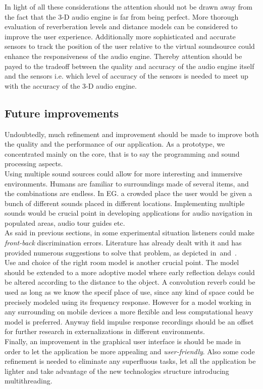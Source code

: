\documentclass[journal]{IEEEtran}
\begin{document}
In light of all these considerations the attention should not be drawn away from the fact that the 3-D audio engine is far from being perfect. More thorough evaluation of reverberation levels and distance models can be considered to improve the user experience. Additionally more sophisticated and accurate sensors to track the position of the user relative to the virtual soundsource could enhance the responsiveness of the audio engine. Thereby attention should be payed to the tradeoff between the quality and accuracy of the audio engine itself and the sensors i.e. which level of accuracy of the sensors is needed to meet up with the accuracy of the 3-D audio engine. 
 

\subsection{Future improvements}
Undoubtedly, much refinement and improvement should be made to improve both the quality and the performance of our application. As a prototype, we concentrated mainly on the core, that is to say the programming and sound processing aspects. \\


Using multiple sound sources could allow for more interesting and immersive environments. Humans are familiar to surroundings made of several items, and the combinations are endless. In EG. a crowded place the user would be given a bunch of different sounds placed in different locations. Implementing multiple sounds would be crucial point in developing applications for audio navigation in populated areas, audio tour guides etc.\\
As said in previous sections, in some experimental situation listeners could make \emph{front-back} discrimination errors. Literature has already dealt with it and has provided numerous suggestions to solve that problem, as depicted in~\cite{blum2012}and~\cite{wightman1999}.\\
Use and choice of the right room model is another crucial point. The model should be extended to a more adoptive model where early reflection delays could be altered according to the distance to the object. A convolution reverb could be used as long as we know the specif place of use, since any kind of space could be precisely modeled using its frequency response. However for a model working in any surrounding on mobile devices a more flexible and less computational heavy model is preferred. Anyway field impulse response recordings should be an offset for further research in externalizations in different environments.\\
Finally, an improvement in the graphical user interface is should be made in order to let the application be more appealing and \emph{user-friendly}. Also some code refinement is needed to eliminate any superfluous tasks, let all the application be lighter and take advantage of the new technologies structure introducing multithreading.
\end{document}

